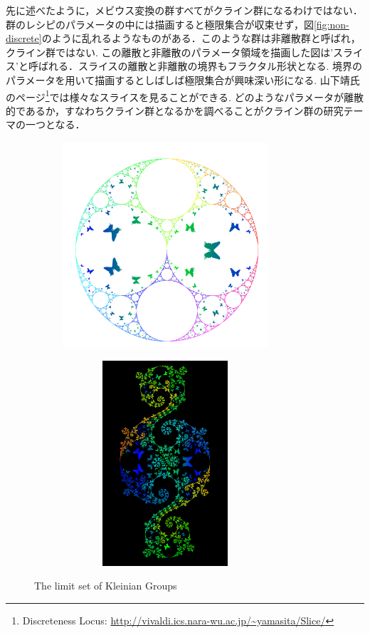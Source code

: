 先に述べたように，メビウス変換の群すべてがクライン群になるわけではない．群のレシピのパラメータの中には描画すると極限集合が収束せず，図\ref{fig:non-discrete}のように乱れるようなものがある．このような群は非離散群と呼ばれ，クライン群ではない. この離散と非離散のパラメータ領域を描画した図は'スライス'と呼ばれる．スライスの離散と非離散の境界もフラクタル形状となる. 境界のパラメータを用いて描画するとしばしば極限集合が興味深い形になる.
山下靖氏のページ\footnote{Discreteness Locus: \url{http://vivaldi.ics.nara-wu.ac.jp/~yamasita/Slice/}}では様々なスライスを見ることができる. どのようなパラメータが離散的であるか，すなわちクライン群となるかを調べることがクライン群の研究テーマの一つとなる．


\begin{figure}[h!tbp]
 \begin{subfigure}{0.49\hsize}
   \begin{center}
    \includegraphics[width=3in, height=3in, keepaspectratio]{../img/klein/apr.pdf}
    \caption{}
    \label{fig:apr}
   \end{center}
 \end{subfigure}
 \hspace*{\fill}
 \begin{subfigure}{0.49\hsize}
   \begin{center}
    \includegraphics[width=3in, height=3in, keepaspectratio]{../img/klein/comp.pdf}
    \caption{}
    \label{fig:comp}
   \end{center}
 \end{subfigure}
 \caption{The limit set of Kleinian Groups}
 \label{fig:limitsetWithOrbit}
\end{figure}

